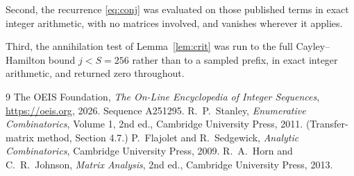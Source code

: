 \documentclass[11pt,a4paper]{article}
\theoremstyle{plain}
\theoremstyle{definition}
\begin{document}
Second, the recurrence \eqref{eq:conj} was evaluated on those published terms in exact
integer arithmetic, with no matrices involved, and vanishes wherever it applies.

Third, the annihilation test of Lemma~\ref{lem:crit} was run to the full Cayley--Hamilton
bound $j<S=256$ rather than to a sampled prefix, in exact integer arithmetic, and returned
zero throughout.

\begin{thebibliography}{9}
 The OEIS Foundation, \emph{The On-Line Encyclopedia of Integer
Sequences}, \url{https://oeis.org}, 2026. Sequence A251295.
 R.~P.~Stanley, \emph{Enumerative Combinatorics}, Volume 1, 2nd ed.,
Cambridge University Press, 2011. (Transfer-matrix method, Section 4.7.)
 P.~Flajolet and R.~Sedgewick, \emph{Analytic Combinatorics}, Cambridge
University Press, 2009.
 R.~A.~Horn and C.~R.~Johnson, \emph{Matrix Analysis}, 2nd ed., Cambridge
University Press, 2013.
\end{thebibliography}
\end{document}
